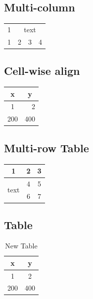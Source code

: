 \documentclass{article}
\begin{document}
\subsection{Multi-column}

\begin{tabular}{|c|ccc|}
	\hline
	1 & \multicolumn{3}{c|}{text} \\ 
	\cline{2-4}
	1 & 2 & 3 & 4  \\
	\hline

\end{tabular}

\subsection{Cell-wise align}
\begin{tabular}{|c c|}
    \hline
    x & y \\
    \hline
    1 & \multicolumn{1}{r|}{2} \\
    200 & 400 \\
    \hline
\end{tabular}


\subsection{Multi-row Table}

\begin{tabular}{|c|c|c|}
	\hline
	1 & 2 & 3 \\ 
	\hline
	\multirow{2}{*}{text} & 4 & 5 \\
	& 6 & 7 \\ 
	\hline


\end{tabular}

\subsection{Table}
\begin{table}[tbp]
    \centering
    \begin{tabular}{|c c|}
        \hline
        x & y \\
        \hline
        1 & 2 \\
        200 & 400 \\
        \hline
    \end{tabular}
    \caption{New Table}
    \label{tab:my_label}
\end{table}
\end{document}
